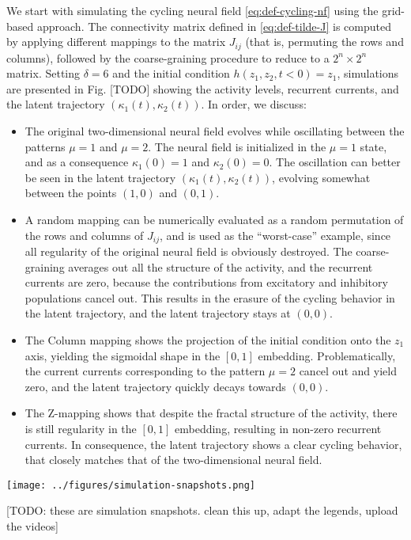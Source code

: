\documentclass[10pt,letterpaper]{article}
\begin{document}
We start with simulating the cycling neural field \autoref{eq:def-cycling-nf} using the grid-based approach. The connectivity matrix defined in \autoref{eq:def-tilde-J} is computed by applying different mappings to the matrix $J_{ij}$ (that is, permuting the rows and columns), followed by the coarse-graining procedure to reduce to a $2^n \times 2^n$ matrix. Setting $\delta=6$ and the initial condition $h(z_1, z_2, t < 0) = z_1$, simulations are presented in Fig. [TODO] showing the activity levels, recurrent currents, and the latent trajectory $(\kappa_1(t), \kappa_2(t))$. In order, we discuss:
\begin{itemize}
\item The original two-dimensional neural field evolves while oscillating between the patterns $\mu=1$ and $\mu=2$. The neural field is initialized in the $\mu=1$ state, and as a consequence $\kappa_1(0)=1$ and $\kappa_2(0)=0$. The oscillation can better be seen in the latent trajectory $(\kappa_1(t), \kappa_2(t))$, evolving somewhat between the points $(1,0)$ and $(0,1)$.
\item A random mapping can be numerically evaluated as a random permutation of the rows and columns of $J_{ij}$, and is used as the ``worst-case'' example, since all regularity of the original neural field is obviously destroyed. The coarse-graining averages out all the structure of the activity, and the recurrent currents are zero, because the contributions from excitatory and inhibitory populations cancel out. This results in the erasure of the cycling behavior in the latent trajectory, and the latent trajectory stays at $(0,0)$.
\item The Column mapping shows the projection of the initial condition onto the $z_1$ axis, yielding the sigmoidal shape in the $[0,1]$ embedding. Problematically, the current currents corresponding to the pattern $\mu=2$ cancel out and yield zero, and the latent trajectory quickly decays towards $(0,0)$.
\item The Z-mapping shows that despite the fractal structure of the activity, there is still regularity in the $[0,1]$ embedding, resulting in non-zero recurrent currents. In consequence, the latent trajectory shows a clear cycling behavior, that closely matches that of the two-dimensional neural field.
\end{itemize}


\texttt{[image: ../figures/simulation-snapshots.png]}

[TODO: these are simulation snapshots. clean this up, adapt the legends, upload the videos]
\endif
\end{document}
